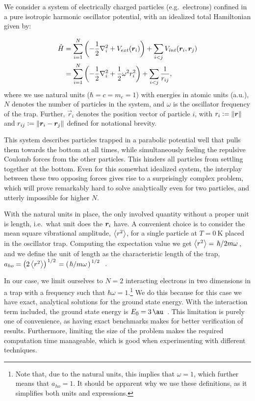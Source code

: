 \documentclass[Thesis.tex]{subfiles}
\begin{document}
We consider a system of electrically charged particles (e.g.\ electrons) confined in a pure
isotropic harmonic oscillator potential, with an idealized total Hamiltonian
given by:

\begin{align}
    \begin{split}
        \hat H &= \sum_{i=1}^N\qty(-\frac{1}{2}\laplacian_i + V_{ext}(\vec r_i)) +
        \sum_{i < j} V_{int}(\vec r_i, \vec r_j)\\
        &= \sum_{i=1}^N\qty(-\frac{1}{2}\laplacian_i + \frac{1}{2}\omega^2
        r_i^2) + \sum_{i < j} \frac{1}{r_{ij}},
    \end{split}\label{eq:H-QD-def}
\end{align}
where we use natural units ($\hbar=c=m_e=1$) with energies in
atomic units (a.u.), $N$ denotes the number of particles in the system, and
$\omega$ is the oscillator frequency of the trap. Further, $\vec r_i$
denotes the position vector of particle $i$, with $r_i \vcentcolon= \norm{\bm{r}}$ and
$r_{ij}\vcentcolon= \norm{\bm{r}_i - \bm{r}_j}$ defined for notational brevity.

This system describes particles trapped in a parabolic potential well that pulls
them towards the bottom at all times, while simultaneously feeling the repulsive
Coulomb forces from the other particles. This hinders all particles from settling together
at the bottom. Even for this somewhat idealized system, the interplay between these two
opposing forces gives rise to a surprisingly complex problem, which will prove remarkably
hard to solve analytically even for two particles, and utterly impossible for higher $N$.

With the natural units in place, the only involved quantity without a proper
unit is length, i.e.\ what unit does the $\bm{r}_i$ have. A convenient
choice is to consider the mean square vibrational amplitude, $\expval{r^2}$, for
a single particle at $T = \SI{0}{\kelvin}$ placed in the oscillator trap.
Computing the expectation value we get
$\expval{r^2}=\flatfrac{\hbar}{2m\omega}$, and we define the unit of length as the
characteristic length of the trap, $a_{ho}=\qty(2\expval{r^2})^{\flatfrac{1}{2}}=\qty(\flatfrac{\hbar}{m\omega})^{\flatfrac{1}{2}}$~\cite{mhj-compphys-II}.

In our case, we limit ourselves to $N=2$ interacting electrons in two
dimensions in a trap with a frequency such that $\hbar \omega =
1$.\footnote{Note that, due to the natural units, this implies that $\omega =
  1$, which further means that $a_{ho} = 1$. It should be apparent why we use these
  definitions, as it simplifies both units and expressions.} We do this because for
this case we have exact, analytical solutions for the ground state energy. With the
interaction term included, the ground state energy is $E_0 = \SI{3}{\au}$~\cite{Taut1993}.
This limitation is purely one of convenience, as having exact benchmarks makes for better
verification of results. Furthermore, limiting the size of the problem makes the required
computation time manageable, which is good when experimenting with different techniques.
\end{document}
